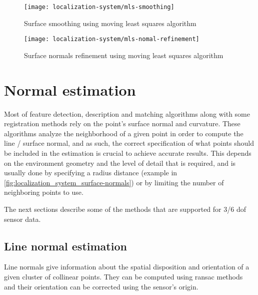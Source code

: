 \begin{figure}[H]
	\centering
	\texttt{[image: localization-system/mls-smoothing]}
	\caption[Surface smoothing using moving least squares algorithm]{Surface smoothing using moving least squares algorithm\protect\footnotemark}
	\label{fig:localization_system_mls-smoothing}
\end{figure}

\begin{figure}[H]
	\centering
	\texttt{[image: localization-system/mls-nomal-refinement]}
	\caption[Surface normals refinement using moving least squares algorithm]{Surface normals refinement using moving least squares algorithm \cite{Rusu2010a}}
	\label{fig:localization_system_mls-nomal-refinement}
\end{figure}



\section{Normal estimation}

Most of feature detection, description and matching algorithms along with some registration methods rely on the point's surface normal and curvature. These algorithms analyze the neighborhood of a given point in order to compute the line / surface normal, and as such, the correct specification of what points should be included in the estimation is crucial to achieve accurate results. This depends on the environment geometry and the level of detail that is required, and is usually done by specifying a radius distance (example in \cref{fig:localization_system_surface-normals}) or by limiting the number of neighboring points to use.

The next sections describe some of the methods that are supported for 3/6 \gls{dof} sensor data.


\subsection{Line normal estimation}

Line normals give information about the spatial disposition and orientation of a given cluster of collinear points. They can be computed using \gls{ransac} methods \cite{Fischler1981} and their orientation can be corrected using the sensor's origin.


